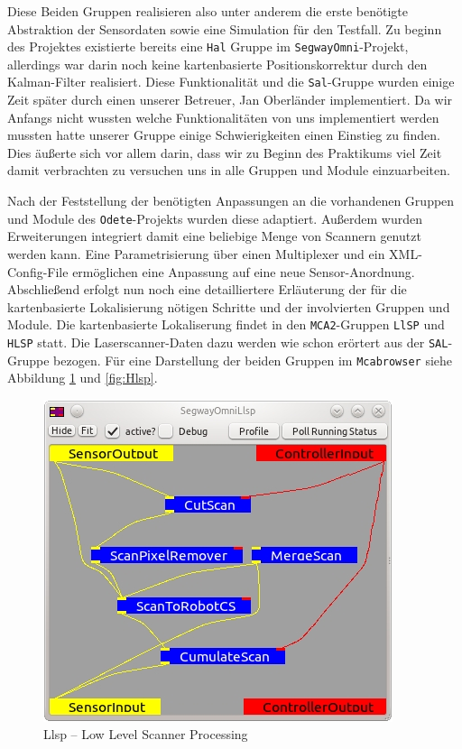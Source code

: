 Diese Beiden Gruppen realisieren also unter anderem die erste benötigte
 Abstraktion der Sensordaten sowie eine Simulation für den Testfall. Zu beginn
 des Projektes existierte bereits eine \lstinline{Hal} Gruppe im
 \lstinline{SegwayOmni}-Projekt, allerdings war darin noch keine kartenbasierte
 Positionskorrektur durch den Kalman-Filter realisiert. Diese Funktionalität und
 die \lstinline{Sal}-Gruppe wurden einige Zeit später durch einen unserer Betreuer,
 Jan Oberländer implementiert. Da wir Anfangs nicht wussten
 welche Funktionalitäten von uns implementiert werden mussten hatte unserer Gruppe einige Schwierigkeiten
 einen Einstieg zu finden. Dies äußerte sich vor allem darin, dass wir zu Beginn des Praktikums viel Zeit damit
 verbrachten zu versuchen uns in alle Gruppen und Module einzuarbeiten.

Nach der Feststellung der benötigten Anpassungen an die vorhandenen Gruppen und
 Module des \lstinline{Odete}-Projekts wurden diese adaptiert. Außerdem wurden
 Erweiterungen integriert damit eine beliebige Menge von Scannern genutzt werden
 kann.
 Eine Parametrisierung über einen Multiplexer und ein XML-Config-File
 ermöglichen eine Anpassung auf eine neue Sensor-Anordnung. Abschließend erfolgt
 nun noch eine detailliertere Erläuterung der für die kartenbasierte
 Lokalisierung nötigen Schritte und der involvierten Gruppen und Module. Die kartenbasierte Lokaliserung
 findet in den \lstinline{MCA2}-Gruppen \lstinline{LlSP} und \lstinline{HLSP}
 statt. Die Laserscanner-Daten dazu werden wie schon erörtert aus der
 \lstinline{SAL}-Gruppe bezogen.
 Für eine Darstellung der beiden Gruppen im \lstinline{Mcabrowser} siehe
 Abbildung \ref{fig:Llsp} und \ref{fig:Hlsp}.
 
\begin{figure}[h]
\center
\includegraphics[scale=0.7]{graphics/Llsp.jpg}
\caption{\label{fig:Llsp}Llsp -- Low Level Scanner Processing}
\end{figure}

